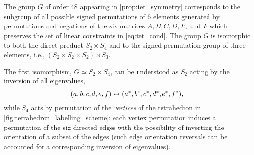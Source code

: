 \documentclass[notitlepage, 11pt, letterpaper]{amsart}
\begin{document}
\begin{rem}
    The group $G$ of order $48$ appearing in \cref{prop:tet_symmetry} corresponds to the subgroup of all possible signed permutations of $6$ elements generated by permutations and negations of the six matrices $A,B,C,D,E$, and $F$ which preserves the set of linear constraints in \cref{eq:tet_cond}.
    The group $G$ is isomorphic to both the direct product $S_2 \times S_4$ and to the signed permutation group of three elements, i.e., $(S_2 \times S_2 \times S_2) \rtimes S_3$.

    The first isomorphism, $G \simeq S_2 \times S_4$, can be understood as $S_2$ acting by the inversion of all eigenvalues,
    \begin{equation}
        (a,b,c,d,e,f) \leftrightarrow (a^*,b^*,c^*,d^*,e^*,f^*),
    \end{equation}
    while $S_4$ acts by permutation of the \textit{vertices} of the tetrahedron in \cref{fig:tetrahedron_labelling_scheme}:
    each vertex permutation induces a permutation of the six directed edges with the possibility of inverting the orientation of a subset of the edges (such edge orientation reversals can be accounted for a corresponding inversion of eigenvalues).


\end{rem}
\end{document}
